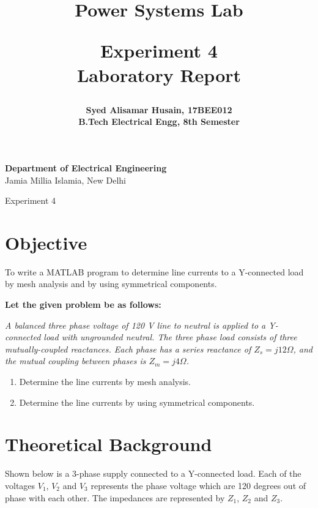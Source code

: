 \documentclass[a4paper,12pt]{article}
\title{
  {\Huge \bf Power Systems Lab}\\
  \vspace{0.25in}

  {\bf Experiment 4}\\
  Laboratory Report
  \vspace{1in}
}
\author{
  \bf Syed Alisamar Husain, 17BEE012\\
  B.Tech Electrical Engg, 8th Semester
}
\begin{document}
  \begin{titlepage}
    \maketitle
    \vspace*{\fill}
    \begin{center}
      {\bfseries Department of Electrical Engineering} \\
      Jamia Millia Islamia, New Delhi
    \end{center}
    \thispagestyle{empty}
  \end{titlepage}
  
  \newpage
  \begin{center}
    \huge Experiment 4
    \vspace{0.5in}
  \end{center}

  \section{Objective}
  To write a MATLAB program to determine line currents to a Y-connected load
  by mesh analysis and by using symmetrical components.

  {\bf Let the given problem be as follows:}
  \begin{center}
    \itshape
    A balanced three phase voltage of 120 V line to neutral is applied to a 
    Y-connected load with ungrounded neutral. The three phase load consists 
    of three mutually-coupled reactances. Each phase has a series reactance of
    $Z_s = j12 \Omega$, and the mutual coupling between phases is $Z_m = j4 \Omega$.
  \end{center}
  \begin{enumerate}
    \itshape
    \item Determine the line currents by mesh analysis.    
    \item Determine the line currents by using symmetrical components.
  \end{enumerate}

  \section{Theoretical Background}
  Shown below is a 3-phase supply connected to a Y-connected load.
  Each of the voltages $V_1$, $V_2$ and $V_3$ represents the phase voltage
  which are 120 degrees out of phase with each other.
  The impedances are represented by $Z_1$, $Z_2$ and $Z_3$.
\end{document}
